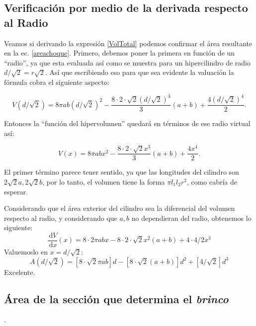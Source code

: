 \documentclass[a4paper,10pt]{article}
\newcommand{\rd}{\, \mathrm{d}}
\begin{document}
\subsection{Verificación por medio de la derivada respecto al Radio}

Veamos si derivando la expresión \ref{VolTotal} podemos confirmar el área 
resultante en la ec. \ref{areachoque}. Primero, debemos poner la primera
en función de un ``radio'', ya que esta evaluada así como se muestra
para un hipercilindro de radio $d/\sqrt{2}= r \sqrt{2}$. Así que escribiendo
eso para que sea evidente la valuación la fórmula cobra el siguiente aspecto:

\begin{equation}\label{VolcomoFuncion}
V(d/\sqrt{2}) =8 \pi ab (d/\sqrt{2})^2
-\frac{8 \cdot 2 \cdot \sqrt{2} (d/\sqrt{2})^3}{3}(a+b)
+\frac{4 (d/\sqrt{2})^4}{2}.
\end{equation} 

Entonces la ``función del hipervolumen'' quedará en términos de ese radio 
virtual así:

\begin{equation}\label{VolcomoFuncion}
V(x) =8 \pi ab x^2
-\frac{8 \cdot 2 \cdot \sqrt{2} x^3}{3}(a+b)
+\frac{4 x^4}{2}.
\end{equation} 

El primer término parece tener sentido, ya que las longitudes del
cilindro son $2\sqrt{2} a, 2\sqrt{2} b$, por lo tanto, el volumen
tiene la forma $\pi l_1 l_2 r^2$, como cabría de esperar. 

Considerando que el área exterior del cilindro sea la diferencial del
volumen respecto al radio, y considerando que $a,b$ no dependieran
del radio, obtenemos lo siguiente:
\begin{equation}\label{DerivadaVolcomoFuncion}
\frac{\rd V}{\rd x}(x) =8\cdot 2  \pi ab x
-8 \cdot 2 \cdot \sqrt{2} x^2(a+b)
+4 \cdot 4 / 2 x^3
\end{equation}
Valuemoslo en $x=d/\sqrt{2}$:
\begin{equation}\label{Areaconfirmada}
A(d/\sqrt{2}) =[8\cdot \sqrt{2}  \pi ab] d
-[8 \cdot  \sqrt{2} (a+b)] d^2
+ [4 / \sqrt{2}] d^3
\end{equation}
Excelente.


\subsection{Área de la sección que determina el \emph{brinco}}.
\end{document}
